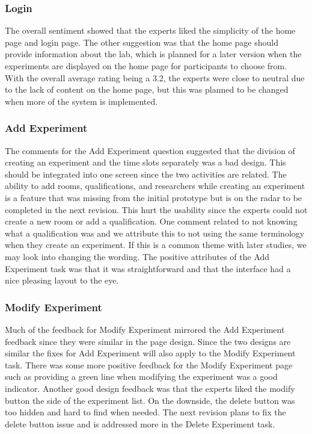 \subsubsection{Login}
The overall sentiment showed that the experts liked the simplicity of the home page and login page. The other suggestion was that the home page should provide information about the lab, which is planned for a later version when the experiments are displayed on the home page for participants to choose from. With the overall average rating being a 3.2, the experts were close to neutral due to the lack of content on the home page, but this was planned to be changed when more of the system is implemented.

\subsubsection{Add Experiment}
The comments for the Add Experiment question suggested that the division of creating an experiment and the time slots separately was a bad design. This should be integrated into one screen since the two activities are related. The ability to add rooms, qualifications, and researchers while creating an experiment is a feature that was missing from the initial prototype but is on the radar to be completed in the next revision. This hurt the usability since the experts could not create a new room or add a qualification. One comment related to not knowing what a qualification was and we attribute this to not using the same terminology when they create an experiment. If this is a common theme with later studies, we may look into changing the wording. The positive attributes of the Add Experiment task was that it was straightforward and that the interface had a nice pleasing layout to the eye.

\subsubsection{Modify Experiment}
Much of the feedback for Modify Experiment mirrored the Add Experiment feedback since they were similar in the page design. Since the two designs are similar the fixes for Add Experiment will also apply to the Modify Experiment task. There was some more positive feedback for the Modify Experiment page such as providing a green line when modifying the experiment was a good indicator. Another good design feedback was that the experts liked the modify button the side of the experiment list. On the downside, the delete button was too hidden and hard to find when needed. The next revision plans to fix the delete button issue and is addressed more in the Delete Experiment task.

